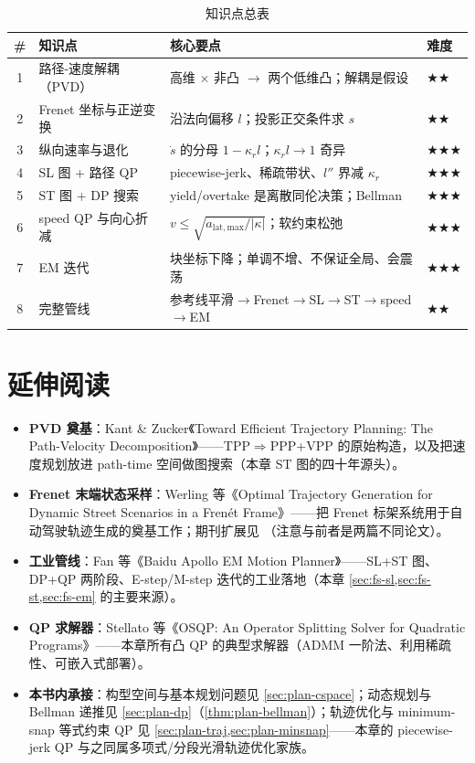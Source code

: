 \begin{table}[H]\centering\small
\caption{知识点总表}
\label{tab:fs-knowledge}
\begin{tabular}{clll}
\toprule
\# & 知识点 & 核心要点 & 难度 \\
\midrule
1 & 路径-速度解耦（PVD） & 高维 $\times$ 非凸 $\to$ 两个低维凸；解耦是假设 & \(\bigstar\bigstar\) \\
2 & Frenet 坐标与正逆变换 & 沿法向偏移 $l$；投影正交条件求 $s$ & \(\bigstar\bigstar\) \\
3 & 纵向速率与退化 & $\dot s$ 的分母 $1-\kappa_r l$；$\kappa_r l\to1$ 奇异 & \(\bigstar\bigstar\bigstar\) \\
4 & SL 图 + 路径 QP & piecewise-jerk、稀疏带状、$l''$ 界减 $\kappa_r$ & \(\bigstar\bigstar\bigstar\) \\
5 & ST 图 + DP 搜索 & yield/overtake 是离散同伦决策；Bellman & \(\bigstar\bigstar\bigstar\) \\
6 & speed QP 与向心折减 & $v\le\sqrt{a_{\mathrm{lat,max}}/|\kappa|}$；软约束松弛 & \(\bigstar\bigstar\bigstar\) \\
7 & EM 迭代 & 块坐标下降；单调不增、不保证全局、会震荡 & \(\bigstar\bigstar\bigstar\) \\
8 & 完整管线 & 参考线平滑$\to$Frenet$\to$SL$\to$ST$\to$speed$\to$EM & \(\bigstar\bigstar\) \\
\bottomrule
\end{tabular}
\end{table}

\section*{延伸阅读}
\begin{itemize}
  \item \textbf{PVD 奠基}：Kant \& Zucker《Toward Efficient Trajectory Planning: The Path-Velocity Decomposition》\cite{kant1986toward}——TPP$\Rightarrow$PPP+VPP 的原始构造，以及把速度规划放进 path-time 空间做图搜索（本章 ST 图的四十年源头）。
  \item \textbf{Frenet 末端状态采样}：Werling 等《Optimal Trajectory Generation for Dynamic Street Scenarios in a Frenét Frame》\cite{werling2010frenet}——把 Frenet 标架系统用于自动驾驶轨迹生成的奠基工作；期刊扩展见 \cite{werling2012optimal}（注意与前者是两篇不同论文）。
  \item \textbf{工业管线}：Fan 等《Baidu Apollo EM Motion Planner》\cite{fan2018baidu}——SL+ST 图、DP+QP 两阶段、E-step/M-step 迭代的工业落地（本章 \cref{sec:fs-sl,sec:fs-st,sec:fs-em} 的主要来源）。
  \item \textbf{QP 求解器}：Stellato 等《OSQP: An Operator Splitting Solver for Quadratic Programs》\cite{stellato2020osqp}——本章所有凸 QP 的典型求解器（ADMM 一阶法、利用稀疏性、可嵌入式部署）。
  \item \textbf{本书内承接}：构型空间与基本规划问题见 \cref{sec:plan-cspace}；动态规划与 Bellman 递推见 \cref{sec:plan-dp}（\cref{thm:plan-bellman}）；轨迹优化与 minimum-snap 等式约束 QP 见 \cref{sec:plan-traj,sec:plan-minsnap}——本章的 piecewise-jerk QP 与之同属多项式/分段光滑轨迹优化家族。
\end{itemize}

